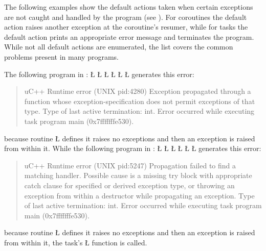 \documentclass[openright,twoside]{report}
\begin{document}
The following examples show the default actions taken when certain exceptions are not caught and handled by the program (see ).
For coroutines the default action raises another exception at the coroutine's resumer, while for tasks the default action prints an appropriate error message and terminates the program.
While not all default actions are enumerated, the list covers the common problems present in many \uC programs.

The following program in :
\LGinlinefalse\LGbegin\lgrinde
\L{}
\CE{}\L{\LB{}}
\L{\LB{\}}}
\L{}
\L{\LB{}}
\L{\LB{\}}}
\endlgrinde\LGend
generates this error:
\begin{quote}
\BGfont
uC++ Runtime error (UNIX pid:4280) Exception propagated through a function whose exception-specification does not permit exceptions of that type.
Type of last active termination: int.
Error occurred while executing task program main (0x7fffffffe530).
\end{quote}
because routine \LGinlinetrue\LGbegin\lgrinde\L{}\endlgrinde\LGend{} defines it raises no exceptions and then an exception is raised from within it.
While the following program in :
\LGinlinefalse\LGbegin\lgrinde
\L{}
\CE{}\L{\LB{}}
\L{\LB{\}}}
\L{}
\L{\LB{}}
\L{\LB{\}}}
\endlgrinde\LGend
generates this error:
\begin{quote}
\BGfont
uC++ Runtime error (UNIX pid:5247) Propagation failed to find a matching handler.
Possible cause is a missing try block with appropriate catch clause for specified or derived exception type,
or throwing an exception from within a destructor while propagating an exception.
Type of last active termination: int.
Error occurred while executing task program main (0x7fffffffe530).
\end{quote}
because routine \LGinlinetrue\LGbegin\lgrinde\L{}\endlgrinde\LGend{} defines it raises no exceptions and then an exception is raised from within it, the task's \LGinlinetrue\LGbegin\lgrinde\L{}\endlgrinde\LGend{} function is called.
\end{document}
